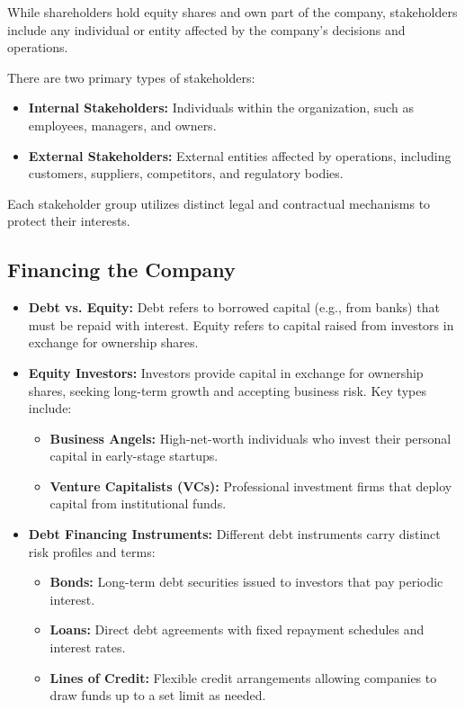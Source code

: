 \documentclass[12pt,a4paper]{report}
\begin{document}
While shareholders hold equity shares and own part of the company, stakeholders include any individual or entity affected by the company's decisions and operations.

There are two primary types of stakeholders:
\begin{itemize}
    \item \textbf{Internal Stakeholders:} Individuals within the organization, such as employees, managers, and owners.
    \item \textbf{External Stakeholders:} External entities affected by operations, including customers, suppliers, competitors, and regulatory bodies.
\end{itemize}

Each stakeholder group utilizes distinct legal and contractual mechanisms to protect their interests.

\subsection{Financing the Company}

\begin{itemize}
    \item \textbf{Debt vs. Equity:} Debt refers to borrowed capital (e.g., from banks) that must be repaid with interest. Equity refers to capital raised from investors in exchange for ownership shares.
    \item \textbf{Equity Investors:} Investors provide capital in exchange for ownership shares, seeking long-term growth and accepting business risk. Key types include:
    \begin{itemize}
        \item \textbf{Business Angels:} High-net-worth individuals who invest their personal capital in early-stage startups.
        \item \textbf{Venture Capitalists (VCs):} Professional investment firms that deploy capital from institutional funds.
    \end{itemize}
    \item \textbf{Debt Financing Instruments:} Different debt instruments carry distinct risk profiles and terms:
    \begin{itemize}
        \item \textbf{Bonds:} Long-term debt securities issued to investors that pay periodic interest.
        \item \textbf{Loans:} Direct debt agreements with fixed repayment schedules and interest rates.
        \item \textbf{Lines of Credit:} Flexible credit arrangements allowing companies to draw funds up to a set limit as needed.
    \end{itemize}
\end{itemize}
\end{document}
